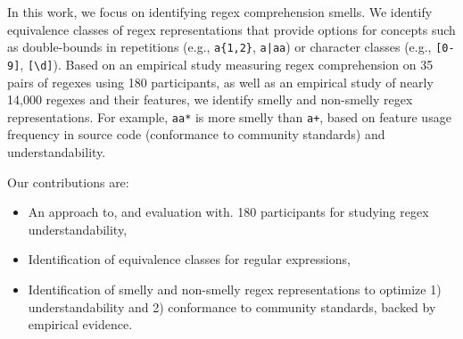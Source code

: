 In this work, we focus on identifying regex comprehension smells. 
We  identify equivalence classes of regex representations that provide options for concepts such as double-bounds in repetitions (e.g., \verb!a{1,2}!, \verb!a|aa!) or 
character classes (e.g., \verb![0-9]!, \verb![\d]!).
Based on an empirical study measuring regex comprehension on 35 pairs of regexes using 180 participants, as well as an empirical study of nearly 14,000 regexes and their features, we identify smelly and non-smelly regex representations. For example, \verb!aa*!  is more smelly than  \verb!a+!, based on feature usage frequency in source code (conformance to community standards) and understandability. 

Our contributions are:
\begin{itemize}
\item An approach to, and evaluation with. 180 participants for studying regex understandability, 
\item Identification of equivalence classes for regular expressions,
\item {Identification of smelly and non-smelly regex representations to optimize 1) understandability and 2) conformance to community standards, backed by empirical evidence.}
\end{itemize}

